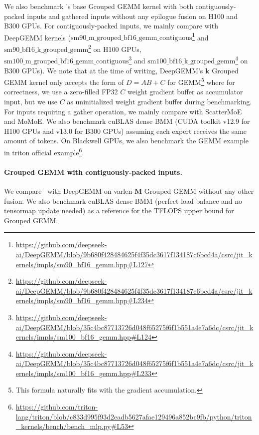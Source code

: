 We also benchmark \Algname's base Grouped GEMM kernel with both contiguously-packed inputs and gathered inputs without any epilogue fusion on H100 and B300 GPUs. For contiguously-packed inputs, we mainly compare with DeepGEMM kernels ($\mathrm{sm90\_m\_grouped\_bf16\_gemm\_contiguous}$\footnote{\scriptsize\url{https://github.com/deepseek-ai/DeepGEMM/blob/9b680f428484625f4f35dc3617f134187c6bcd4a/csrc/jit_kernels/impls/sm90_bf16_gemm.hpp\#L127}} and $\mathrm{sm90\_bf16\_k\_grouped\_gemm}$\footnote{\scriptsize\url{https://github.com/deepseek-ai/DeepGEMM/blob/9b680f428484625f4f35dc3617f134187c6bcd4a/csrc/jit_kernels/impls/sm90_bf16_gemm.hpp\#L234}} on H100 GPUs, $\mathrm{sm100\_m\_grouped\_bf16\_gemm\_contiguous}$\footnote{\scriptsize\url{https://github.com/deepseek-ai/DeepGEMM/blob/35c4bc87713726d048f65275f6f1b551a4e7a6dc/csrc/jit_kernels/impls/sm100_bf16_gemm.hpp\#L124}} and $\mathrm{sm100\_bf16\_k\_grouped\_gemm}$\footnote{\scriptsize\url{https://github.com/deepseek-ai/DeepGEMM/blob/35c4bc87713726d048f65275f6f1b551a4e7a6dc/csrc/jit_kernels/impls/sm100_bf16_gemm.hpp\#L233}} on B300 GPUs). We note that at the time of writing, DeepGEMM's $\mathbf{k}$ Grouped GEMM kernel only accepts the form of $D = A B+C$ for GEMM\footnote{This formula naturally fits with the gradient accumulation.} where for correctness, we use a zero-filled FP32 $C$ weight gradient buffer as accumulator input, but we use $C$ as uninitialized weight gradient buffer during benchmarking. For inputs requiring a gather operation, we mainly compare with ScatterMoE and MoMoE. We also benchmark cuBLAS dense BMM (CUDA toolkit v12.9 for H100 GPUs and v13.0 for B300 GPUs) assuming each expert receives the same amount of tokens. On Blackwell GPUs, we also benchmark the GEMM example in triton official example\footnote{\scriptsize\url{https://github.com/triton-lang/triton/blob/c833d995f93d2eadb5627afae129496a852bc9fb/python/triton_kernels/bench/bench_mlp.py\#L53}}.


\paragraph{Grouped GEMM with contiguously-packed inputs.} We compare \Algname~with DeepGEMM on varlen-$\mathbf{M}$ Grouped GEMM without any other fusion. We also benchmark cuBLAS dense BMM (perfect load balance and no tensormap update needed) as a reference for the TFLOPS upper bound for Grouped GEMM. 



